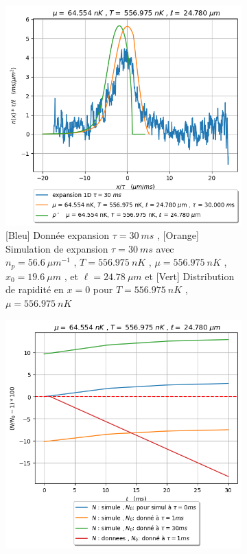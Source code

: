 \documentclass[a3, 10pt,twoside]{article}          %
\theoremstyle{plain}
\theoremstyle{definition}
\theoremstyle{remark}
\theoremstyle{definition} %
\def\OliveGreen{OliveGreen}
\begin{document}
\begin{figure}[H]
     		\begin{subfigure}[b]{0.45\textwidth}
        		\centering
        		\includegraphics[width=\textwidth]{Figures/simul_expansion_30_24-04-2024}
        		\caption{{\color{blue}[Bleu] Donnée  expansion $\tau = 30~ms$} , {\color{orange}[Orange] Simulation de  expansion $\tau = 30~ms$ avec $n_p = 56.6 ~{\mu m}^{-1}$ , $T = 556.975 ~nK$ , $\mu=556.975 ~nK$ , $x_0 = 19.6~\mu m$ , et $\ell = 24.78~\mu m$} et {\color{\OliveGreen}[Vert] Distribution de rapidité en $x = 0$ pour  $T = 556.975 ~nK$ , $\mu=556.975 ~nK$} }
        		\label{fig:expansion30}
    		\end{subfigure}
    		\hfill
    		\begin{subfigure}[b]{0.45\textwidth}
        		\centering
        		\includegraphics[width=\textwidth]{Figures/Nat}

\end{subfigure}
\end{figure}
\end{document}
